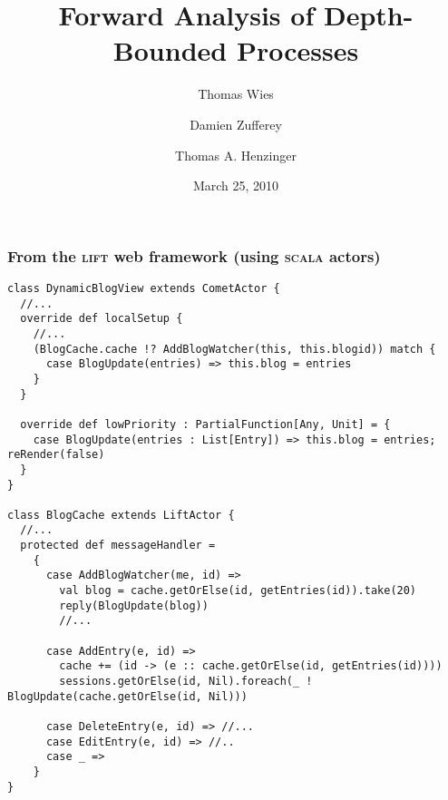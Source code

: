 \documentclass{beamer}
\title[Forward Analysis]{Forward Analysis of Depth-Bounded Processes}
\author{Thomas Wies \and \alert{Damien Zufferey} \and Thomas A. Henzinger}
\institute{
  IST Austria (Institute of Science and Technology Austria)
}
\date{March 25, 2010}
\begin{document}
\frame[plain]{\titlepage}


\begin{frame}[fragile]
  \frametitle{From the \textsc{lift} web framework (using \textsc{scala} actors) }
  {\tiny
  \begin{verbatim}
class DynamicBlogView extends CometActor {
  //...
  override def localSetup {
    //...
    (BlogCache.cache !? AddBlogWatcher(this, this.blogid)) match {
      case BlogUpdate(entries) => this.blog = entries
    }
  }
                                                                                                                      
  override def lowPriority : PartialFunction[Any, Unit] = {
    case BlogUpdate(entries : List[Entry]) => this.blog = entries; reRender(false)
  }
}

class BlogCache extends LiftActor {
  //...
  protected def messageHandler =
    {
      case AddBlogWatcher(me, id) =>
        val blog = cache.getOrElse(id, getEntries(id)).take(20)
        reply(BlogUpdate(blog))
        //...
                                                    
      case AddEntry(e, id) =>
        cache += (id -> (e :: cache.getOrElse(id, getEntries(id))))
        sessions.getOrElse(id, Nil).foreach(_ ! BlogUpdate(cache.getOrElse(id, Nil)))
      
      case DeleteEntry(e, id) => //...
      case EditEntry(e, id) => //..
      case _ =>
    }
}
  \end{verbatim}
  }
\end{frame}
\end{document}
